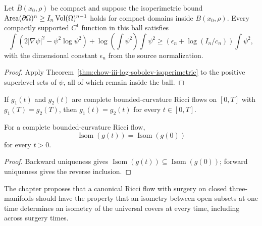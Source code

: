 \begin{theorem}
\label{thm:chow-iii-local-log-sobolev}


Let \(\overline B(x_0,\rho)\) be compact and suppose the isoperimetric bound
\(\operatorname{Area}(\partial\Omega)^n\ge I_n\operatorname{Vol}(\Omega)^{n-1}\) holds for compact domains
inside \(B(x_0,\rho)\).  Every compactly supported \(C^1\) function in this ball
satisfies
\[
 \int(2|\nabla\psi|^2-\psi^2\log\psi^2)
 +\log\!\left(\int\psi^2\right)\int\psi^2
 \ge\left(\epsilon_n+\log(I_n/c_n)\right)\int\psi^2,
\]
with the dimensional constant \(\epsilon_n\) from the source normalization.
\end{theorem}
\begin{proof}
\sketch Apply Theorem~\ref{thm:chow-iii-log-sobolev-isoperimetric} to the
positive superlevel sets of \(\psi\), all of which remain inside the ball.
\end{proof}

\begin{theorem}
\label{thm:chow-iii-backward-uniqueness}

If \(g_1(t)\) and \(g_2(t)\) are complete bounded-curvature Ricci flows on
\([0,T]\) with \(g_1(T)=g_2(T)\), then \(g_1(t)=g_2(t)\) for every
\(t\in[0,T]\).
\end{theorem}

\begin{corollary}
\label{cor:chow-iii-isometry-group-preserved}


For a complete bounded-curvature Ricci flow,
\[
 \operatorname{Isom}(g(t))=\operatorname{Isom}(g(0))
\]
for every \(t>0\).
\end{corollary}
\begin{proof}
\sketch Backward uniqueness gives \(\operatorname{Isom}(g(t))\subseteq\operatorname{Isom}(g(0))\);
forward uniqueness gives the reverse inclusion.
\end{proof}

\begin{remark}
\label{rem:chow-iii-canonical-surgery-criterion}

The chapter proposes that a canonical Ricci flow with surgery on closed
three-manifolds should have the property that an isometry between open subsets
at one time determines an isometry of the universal covers at every time,
including across surgery times.
\end{remark}
